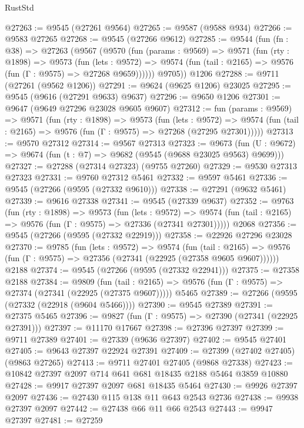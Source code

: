 \begin{lexlean}{RustStd}
\begin{coremodule}
@27263 := @9545 (@27261 @9564)
@27265 := @9587 (@9588 @934)
@27266 := @9583 @27265
@27268 := @9545 (@27266 @9612)
@27285 := @9544
    (fun (fn : @38) =>
    @27263
      (@9567
        (@9570
          (fun (params : @9569) =>
          @9571
            (fun (rty : @1898) =>
            @9573
              (fun (lets : @9572) =>
              @9574 (fun (tail : @2165) => @9576 (fun (Γ : @9575) => @27268 @9659))))))
        @9705))
    @1206
@27288 := @9711 (@27261 (@9562 @1206))
@27291 := @9624 (@9625 @1206) @23025
@27295 := @9545 (@9616 (@27291 @9633) @9637)
@27296 := @9650 @1206
@27301 := @9647 (@9649 @27296 @23028 @9605 @9607)
@27312 := fun (params : @9569) =>
  @9571
    (fun (rty : @1898) =>
    @9573
      (fun (lets : @9572) =>
      @9574 (fun (tail : @2165) => @9576 (fun (Γ : @9575) => @27268 (@27295 @27301)))))
@27313 := @9570 @27312
@27314 := @9567 @27313
@27323 := @9673
    (fun (U : @9672) => @9674 (fun (t : @7) => @9682 (@9545 (@9688 @23025 @9563) @9699)))
@27327 := @27288 (@27314 @27323) (@9755 @27260)
@27329 := @9530 @27313 @27323
@27331 := @9760 @27312 @5461
@27332 := @9597 @5461
@27336 := @9545 (@27266 (@9595 (@27332 @9610)))
@27338 := @27291 (@9632 @5461)
@27339 := @9616 @27338
@27341 := @9545 (@27339 @9637)
@27352 := @9763
    (fun (rty : @1898) =>
    @9573
      (fun (lets : @9572) =>
      @9574 (fun (tail : @2165) => @9576 (fun (Γ : @9575) => @27336 (@27341 @27301)))))
    @2068
@27356 := @9545 (@27266 (@9595 (@27332 @22919)))
@27358 := @22926 @27296 @23028
@27370 := @9785
    (fun (lets : @9572) =>
    @9574
      (fun (tail : @2165) =>
      @9576 (fun (Γ : @9575) => @27356 (@27341 (@22925 (@27358 @9605 @9607))))))
    @2188
@27374 := @9545 (@27266 (@9595 (@27332 @22941)))
@27375 := @27358 @2188
@27384 := @9809
    (fun (tail : @2165) => @9576 (fun (Γ : @9575) => @27374 (@27341 (@22925 (@27375 @9607)))))
    @5465
@27389 := @27266 (@9595 (@27332 (@22918 (@9604 @5466))))
@27390 := @9545 @27389
@27391 := @27375 @5465
@27396 := @9827 (fun (Γ : @9575) => @27390 (@27341 (@22925 @27391)))
@27397 := @11170 @17667
@27398 := @27396 @27397
@27399 := @9711 @27389
@27401 := @27339 (@9636 @27397)
@27402 := @9545 @27401
@27405 := @9643 @27397 @22924 @27391
@27409 := @27399 (@27402 @27405) (@9863 @27265)
@27413 := @9711 @27401 @27405 (@9868 @27338)
@27423 := @10842 @27397 @2097 @714 @641 @681 @18435 @2188 @5464 @3859 @10880
@27428 := @9917 @27397 @2097 @681 @18435 @5464
@27430 := @9926 @27397 @2097
@27436 := @27430 @115 @138 @11 @643 @2543 @2736
@27438 := @9938 @27397 @2097
@27442 := @27438 @66 @11 @66 @2543
@27443 := @9947 @27397
@27481 := @27259

\end{coremodule}
\end{lexlean}
